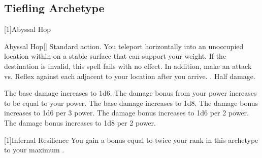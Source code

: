   \subsection{Tiefling Archetype}
    [1]{Abyssal Hop}
      \begin{magicalactiveability}{Abyssal Hop}[\atFire]
        \abilityusagetime Standard action.
        \rankline
        You teleport horizontally into an unoccupied location within \shortrange on a stable surface that can support your weight.
        If the destination is invalid, this spell fails with no effect.
        In addition, make an attack vs. Reflex against each  adjacent to your location after you arrive.
        \hit \damagerankzero.
        \miss Half damage.

        \rankline
         The base damage increases to 1d6.
         The damage bonus from your power increases to be equal to your power.
         The base damage increases to 1d8.
         The damage bonus increases to 1d6 per 3 power.
         The damage bonus increases to 1d6 per 2 power.
         The damage bonus increases to 1d8 per 2 power.
      \end{magicalactiveability}

    [1]{Infernal Resilience} You gain a bonus equal to twice your rank in this archetype to your maximum .

